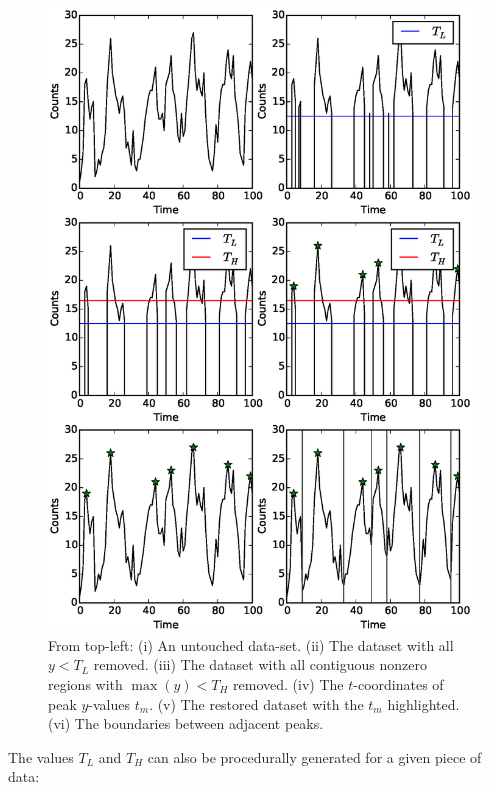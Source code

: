 \begin{figure}
    \includegraphics[width=\columnwidth, trim = 0mm 30mm 0mm 28mm]{images/steps.eps}
    \captionsetup{singlelinecheck=off}
    \caption{From top-left: (i) An untouched data-set.  (ii) The dataset with all $y<T_L$ removed.  (iii) The dataset with all contiguous nonzero regions with $\max(y)<T_H$ removed.  (iv) The $t$-coordinates of peak $y$-values $t_m$.  (v) The restored dataset with the $t_m$ highlighted.  (vi) The boundaries between adjacent peaks.}
   \label{fig:BurstAlg}
\end{figure}

The values $T_L$ and $T_H$ can also be procedurally generated for a given piece of data:

